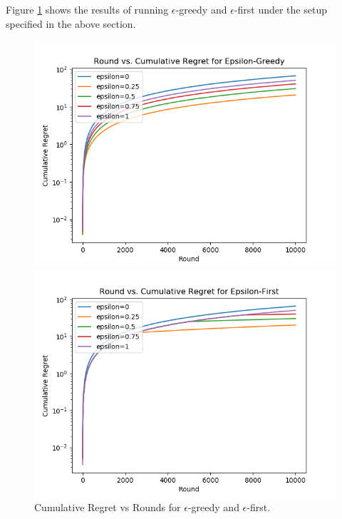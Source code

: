 \documentclass[12pt]{article}
\begin{document}
Figure \ref{fig:epsilon-greedy-first} shows the results of running $\epsilon$-greedy and $\epsilon$-first under the setup specified in the above section.
\begin{figure}[H]
\begin{minipage}[h]{0.5\linewidth}
\includegraphics[width=\linewidth, height=0.75\linewidth]{epsilon-greedy.png}
\end{minipage}
\begin{minipage}[h]{0.5\linewidth}
\includegraphics[width=\linewidth, height=0.75\linewidth]{epsilon-first.png}
\end{minipage}
\captionsetup{justification=centering}
\caption{Cumulative Regret vs Rounds for $\epsilon$-greedy and $\epsilon$-first.}
\label{fig:epsilon-greedy-first}
\end{figure}
\end{document}
